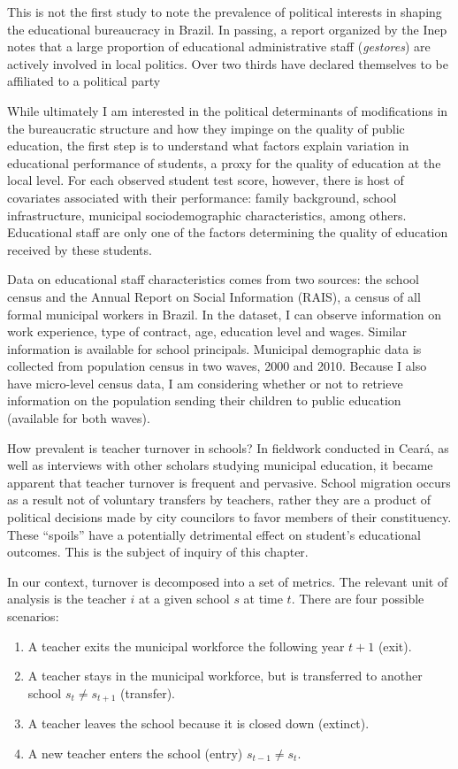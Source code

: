 \documentclass[12pt,]{book}
\providecommand{\tightlist}{%
  \setlength{\itemsep}{0pt}\setlength{\parskip}{0pt}}
\begin{document}
This is not the first study to note the prevalence of political interests in shaping the educational bureaucracy in Brazil. In passing, a report organized by the Inep notes that a large proportion of educational administrative staff (\textit{gestores}) are actively involved in local politics. Over two thirds have declared themselves to be affiliated to a political party

While ultimately I am interested in the political determinants of modifications in the bureaucratic structure and how they impinge on the quality of public education, the first step is to understand what factors explain variation in educational performance of students, a proxy for the quality of education at the local level. For each observed student test score, however, there is host of covariates associated with their performance: family background, school infrastructure, municipal sociodemographic characteristics, among others. Educational staff are only one of the factors determining the quality of education received by these students.

Data on educational staff characteristics comes from two sources: the school census and the Annual Report on Social Information (RAIS), a census of all formal municipal workers in Brazil. In the dataset, I can observe information on work experience, type of contract, age, education level and wages. Similar information is available for school principals. Municipal demographic data is collected from population census in two waves, 2000 and 2010. Because I also have micro-level census data, I am considering whether or not to retrieve information on the population sending their children to public education (available for both waves).

How prevalent is teacher turnover in schools? In fieldwork conducted in Ceará, as well as interviews with other scholars studying municipal education, it became apparent that teacher turnover is frequent and pervasive. School migration occurs as a result not of voluntary transfers by teachers, rather they are a product of political decisions made by city councilors to favor members of their constituency. These ``spoils'' have a potentially detrimental effect on student's educational outcomes. This is the subject of inquiry of this chapter.

In our context, turnover is decomposed into a set of metrics. The relevant unit of analysis is the teacher \(i\) at a given school \(s\) at time \(t\). There are four possible scenarios:

\begin{enumerate}
\def\labelenumi{\arabic{enumi})}
\tightlist
\item
  A teacher exits the municipal workforce the following year \(t+1\) (exit).
\item
  A teacher stays in the municipal workforce, but is transferred to another school \(s_t \neq s_{t+1}\) (transfer).
\item
  A teacher leaves the school because it is closed down (extinct).
\item
  A new teacher enters the school (entry) \(s_{t-1} \neq s_{t}\).
\end{enumerate}
\end{document}
